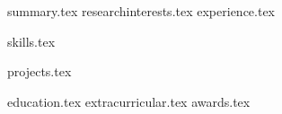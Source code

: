 \documentclass[a4paper,12pt]{article}
\begin{document}
\pagecolor{Background}


{summary.tex}
{researchinterests.tex}
{experience.tex}
\begin{multicols}{2}
{skills.tex}
\end{multicols}
{projects.tex}

\pagebreak
{education.tex}
{extracurricular.tex}
{awards.tex}
\end{document}
